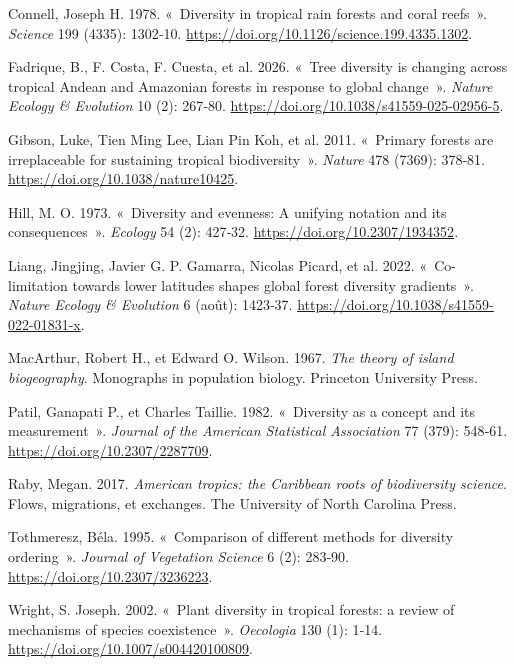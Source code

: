 \documentclass[
  french,
  11pt,
]{stylisharticle}
\newlength{\cslhangindent}
\newenvironment{CSLReferences}[2] %
 {\begin{list}{}{%
  \setlength{\itemindent}{0pt}
  \setlength{\leftmargin}{0pt}
  \setlength{\parsep}{0pt}
  \ifodd #1
   \setlength{\leftmargin}{\cslhangindent}
   \setlength{\itemindent}{-1\cslhangindent}
  \fi
  \setlength{\itemsep}{#2\baselineskip}}}
 {\end{list}}
\begin{document}
\protect{}\label{refs}
\begin{CSLReferences}{1}{1}
Connell, Joseph H. 1978. {«~Diversity in tropical rain forests and coral
reefs~»}. \emph{Science} 199 (4335): 1302‑10.
\url{https://doi.org/10.1126/science.199.4335.1302}.

{Fadrique, B., F. Costa, F. Cuesta, et al.} 2026. {«~Tree diversity is
changing across tropical Andean and Amazonian forests in response to
global change~»}. \emph{Nature Ecology \& Evolution} 10 (2): 267‑80.
\url{https://doi.org/10.1038/s41559-025-02956-5}.

{Gibson, Luke, Tien Ming Lee, Lian Pin Koh, et al.} 2011. {«~Primary
forests are irreplaceable for sustaining tropical biodiversity~»}.
\emph{Nature} 478 (7369): 378‑81.
\url{https://doi.org/10.1038/nature10425}.

Hill, M. O. 1973. {«~Diversity and evenness: A unifying notation and its
consequences~»}. \emph{Ecology} 54 (2): 427‑32.
\url{https://doi.org/10.2307/1934352}.

{Liang, Jingjing, Javier G. P. Gamarra, Nicolas Picard, et al.} 2022.
{«~Co-limitation towards lower latitudes shapes global forest diversity
gradients~»}. \emph{Nature Ecology \& Evolution} 6 (août): 1423‑37.
\url{https://doi.org/10.1038/s41559-022-01831-x}.

MacArthur, Robert H., et Edward O. Wilson. 1967. \emph{The theory of
island biogeography}. Monographs in population biology. Princeton
University Press.

Patil, Ganapati P., et Charles Taillie. 1982. {«~Diversity as a concept
and its measurement~»}. \emph{Journal of the American Statistical
Association} 77 (379): 548‑61. \url{https://doi.org/10.2307/2287709}.

Raby, Megan. 2017. \emph{American tropics: the Caribbean roots of
biodiversity science}. Flows, migrations, et exchanges. The University
of North Carolina Press.

Tothmeresz, Béla. 1995. {«~Comparison of different methods for diversity
ordering~»}. \emph{Journal of Vegetation Science} 6 (2): 283‑90.
\url{https://doi.org/10.2307/3236223}.

Wright, S. Joseph. 2002. {«~Plant diversity in tropical forests: a
review of mechanisms of species coexistence~»}. \emph{Oecologia} 130
(1): 1‑14. \url{https://doi.org/10.1007/s004420100809}.

\end{CSLReferences}
\end{document}

